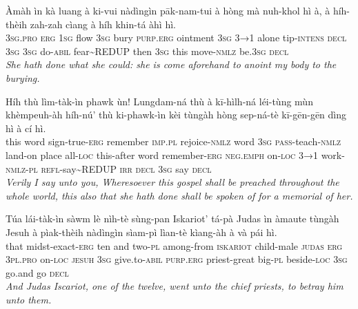 \documentclass[11pt,a4paper]{article}
\begin{document}
\begin{exe}
\gll Àmàh ìn kà luang à ki-vui nàdìngìn pāk-nam-tui à hòng mà nuh-khol hì à, à híh-thèih zah-zah cìang à híh khin-tá àhì hì. \\
     \textsc{3sg}.\textsc{pro} \textsc{erg} \textsc{1sg} flow \textsc{3sg} bury \textsc{purp}.\textsc{erg} ointment \textsc{3sg} \textsc{3→1} alone tip-\textsc{intens} \textsc{decl} \textsc{3sg} \textsc{3sg} do-\textsc{abil} fear\textasciitilde{}REDUP then \textsc{3sg} this move-\textsc{nmlz} be.\textsc{3sg} \textsc{decl} \\
\glt \textcolor{kjvcolor}{\textit{She hath done what she could: she is come aforehand to anoint my body to the burying.}}

\gll Híh thù lìm-tàk-ìn phawk ùn! Lungdam-ná thù à kī-hìlh-ná léi-tùng mùn khèmpeuh-àh híh-nú' thù ki-phawk-ìn kèi tùngàh hòng sep-ná-tè kī-gēn-gēn dìng hì à cí hì. \\
     this word sign-true-\textsc{erg} remember \textsc{imp}.\textsc{pl} rejoice-\textsc{nmlz} word \textsc{3sg} \textsc{pass}-teach-\textsc{nmlz} land-on place all-\textsc{loc} this-after word remember-\textsc{erg} \textsc{neg}.\textsc{emph} on-\textsc{loc} \textsc{3→1} work-\textsc{nmlz}-\textsc{pl} \textsc{refl}-say\textasciitilde{}REDUP \textsc{irr} \textsc{decl} \textsc{3sg} say \textsc{decl} \\
\glt \textcolor{kjvcolor}{\textit{Verily I say unto you, Wheresoever this gospel shall be preached throughout the whole world, this also that she hath done shall be spoken of for a memorial of her.}}

\gll Túa lái-tàk-ìn sàwm lè nìh-tè sùng-pan Iskariot' tá-pà Judas ìn àmaute tùngàh Jesuh à pìak-thèih nàdìngìn sìam-pì lìan-tè kìang-àh à và pái hì. \\
     that midst-exact-\textsc{erg} ten and two-\textsc{pl} among-from \textsc{iskariot} child-male \textsc{judas} \textsc{erg} \textsc{3pl}.\textsc{pro} on-\textsc{loc} \textsc{jesuh} \textsc{3sg} give.to-\textsc{abil} \textsc{purp}.\textsc{erg} priest-great big-\textsc{pl} beside-\textsc{loc} \textsc{3sg} go.and go \textsc{decl} \\
\glt \textcolor{kjvcolor}{\textit{And Judas Iscariot, one of the twelve, went unto the chief priests, to betray him unto them.}}


\end{exe}
\end{document}
